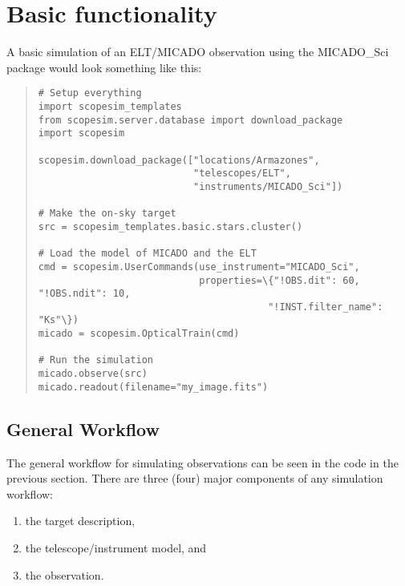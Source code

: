 

\section{Basic functionality%
  \label{basic-functionality}%
}

A basic simulation of an ELT/MICADO observation using the MICADO\_Sci package would look something like this:

\begin{quote}
\begin{alltt}
\begin{lstlisting}[frame=single]
# Setup everything
import scopesim_templates
from scopesim.server.database import download_package
import scopesim

scopesim.download_package(["locations/Armazones",
                           "telescopes/ELT",
                           "instruments/MICADO_Sci"])

# Make the on-sky target
src = scopesim_templates.basic.stars.cluster()

# Load the model of MICADO and the ELT
cmd = scopesim.UserCommands(use_instrument="MICADO_Sci",
                            properties=\{"!OBS.dit": 60, "!OBS.ndit": 10,
                                        "!INST.filter_name": "Ks"\})
micado = scopesim.OpticalTrain(cmd)

# Run the simulation
micado.observe(src)
micado.readout(filename="my_image.fits")
\end{lstlisting}
\end{alltt}
\end{quote}


\subsection{General Workflow%
  \label{general-workflow}%
}

The general workflow for simulating observations can be seen in the code in the previous section.
There are three (four) major components of any simulation workflow:

\begin{enumerate}
\item the target description,

\item the telescope/instrument model, and

\item the observation.
\end{enumerate}


